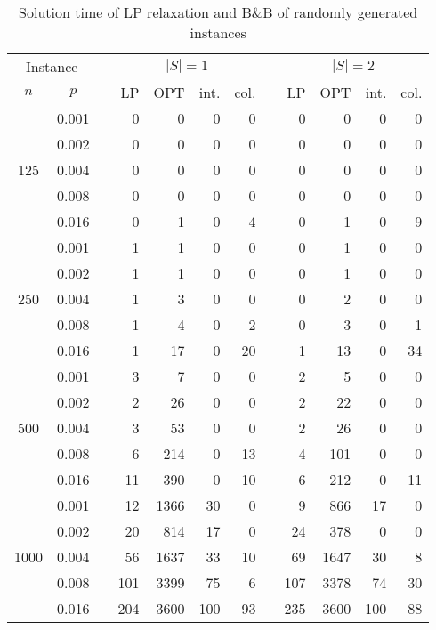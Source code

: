 \begin{table}[]
\begin{tabular}{ccrrrrrrrrrr}
\multicolumn{2}{c}{Instance} & & \multicolumn{4}{c}{$|S|=1$} & &\multicolumn{4}{c}{$|S|=2$} \\
\cline{1-2}\cline{4-7}\cline{9-12}
$n$ & $p$ & & LP  & OPT & int. & col.& & LP  & OPT & int. & col. \\
\hline
\multirow{5}{*}{125}       
 & 0.001 & &0   &  0 & 0 & 0 & & 0  &  0 &  0  &  0 \\ 
 & 0.002 & &0   &  0 & 0 & 0 & & 0  &  0 &  0  &  0 \\
 & 0.004 & &0   &  0 & 0 & 0 & & 0  &  0 &  0  &  0 \\
 & 0.008 & &0   &  0 & 0 & 0 & & 0  &  0 &  0  &  0 \\
 & 0.016 & &0   &  1 & 0 & 4 & & 0  &  1 &  0  &  9 \\
\hline                         
\multirow{5}{*}{250}                               
 & 0.001 & & 1  &  1 & 0 & 0 & & 0  &  1 & 0   & 0  \\
 & 0.002 & & 1  &  1 & 0 & 0 & & 0  &  1 & 0   & 0  \\
 & 0.004 & & 1  &  3 & 0 & 0 & & 0  &  2 & 0   & 0  \\
 & 0.008 & & 1  &  4 & 0 & 2 & & 0  &  3 & 0   & 1  \\
 & 0.016 & & 1  & 17 & 0 &20 & & 1  & 13 & 0   &34  \\
\hline                         
\multirow{5}{*}{500}                               
 & 0.001 & & 3   &  7 & 0 & 0 & & 2  &  5 & 0   & 0  \\
 & 0.002 & & 2   & 26 & 0 & 0 & & 2  & 22 & 0   & 0  \\
 & 0.004 & & 3   & 53 & 0 & 0 & & 2  & 26 & 0   & 0  \\
 & 0.008 & & 6   &214 & 0 &13 & & 4  &101 & 0   & 0  \\
 & 0.016 & &11   &390 & 0 &10 & & 6  &212 & 0   &11  \\
\hline                         
\multirow{5}{*}{1000}                               
 & 0.001 & & 12  &1366& 30& 0 & & 9  &866   & 17 & 0 \\
 & 0.002 & & 20  & 814& 17& 0 & & 24 &378   & 0  & 0 \\
 & 0.004 & & 56  &1637& 33&10 & & 69 &1647  & 30 & 8 \\
 & 0.008 & &101  &3399& 75& 6 & & 107&3378  & 74 &30 \\
 & 0.016 & &204  &3600&100&93 & & 235&3600  &100 &88 
\end{tabular}
\caption{Solution time of LP relaxation and B\&B of randomly generated instances}
\label{tab:soltime}
\end{table}
			 

